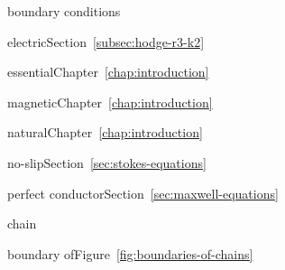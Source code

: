 \par\noindent\hspace*{0em}\label{index:boundary-conditions}{boundary conditions}

\par\noindent\hspace*{1em}\label{index:boundary-conditions-electric}{electric}\quad Section~\ref{subsec:hodge-r3-k2}

\par\noindent\hspace*{1em}\label{index:boundary-conditions-essential}{essential}\quad Chapter~\ref{chap:introduction}

\par\noindent\hspace*{1em}\label{index:boundary-conditions-magnetic}{magnetic}\quad Chapter~\ref{chap:introduction}

\par\noindent\hspace*{1em}\label{index:boundary-conditions-natural}{natural}\quad Chapter~\ref{chap:introduction}

\par\noindent\hspace*{1em}\label{index:boundary-conditions-no-slip}{no-slip}\quad Section~\ref{sec:stokes-equations}

\par\noindent\hspace*{1em}\label{index:boundary-conditions-perfect-conductor}{perfect conductor}\quad Section~\ref{sec:maxwell-equations}

\par\noindent\hspace*{0em}\label{index:chain}{chain}

\par\noindent\hspace*{1em}\label{index:chain-boundary-of}{boundary of}\quad Figure~\ref{fig:boundaries-of-chains}

